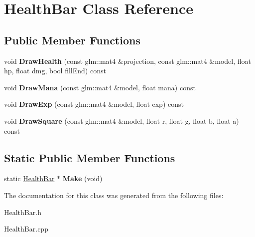 \hypertarget{classHealthBar}{\section{\-Health\-Bar \-Class \-Reference}
\label{classHealthBar}
}
\subsection*{\-Public \-Member \-Functions}
\begin{DoxyCompactItemize}
\item 
\hypertarget{classHealthBar_ab770347eef434ff3d4ddb3e9137f1b92}{void {\bfseries \-Draw\-Health} (const glm\-::mat4 \&projection, const glm\-::mat4 \&model, float hp, float dmg, bool fill\-End) const }\label{classHealthBar_ab770347eef434ff3d4ddb3e9137f1b92}

\item 
\hypertarget{classHealthBar_a59eb8ee3af6547c458181c11fa6448fd}{void {\bfseries \-Draw\-Mana} (const glm\-::mat4 \&model, float mana) const }\label{classHealthBar_a59eb8ee3af6547c458181c11fa6448fd}

\item 
\hypertarget{classHealthBar_a1a50ea18932589c8cb3bd4162692ef45}{void {\bfseries \-Draw\-Exp} (const glm\-::mat4 \&model, float exp) const }\label{classHealthBar_a1a50ea18932589c8cb3bd4162692ef45}

\item 
\hypertarget{classHealthBar_aa597088b67758f39ff13380ceafe25bf}{void {\bfseries \-Draw\-Square} (const glm\-::mat4 \&model, float r, float g, float b, float a) const }\label{classHealthBar_aa597088b67758f39ff13380ceafe25bf}

\end{DoxyCompactItemize}
\subsection*{\-Static \-Public \-Member \-Functions}
\begin{DoxyCompactItemize}
\item 
\hypertarget{classHealthBar_adaf212118d98abc5741033077b951553}{static \hyperlink{classHealthBar}{\-Health\-Bar} $\ast$ {\bfseries \-Make} (void)}\label{classHealthBar_adaf212118d98abc5741033077b951553}

\end{DoxyCompactItemize}


\-The documentation for this class was generated from the following files\-:\begin{DoxyCompactItemize}
\item 
\-Health\-Bar.\-h\item 
\-Health\-Bar.\-cpp\end{DoxyCompactItemize}
